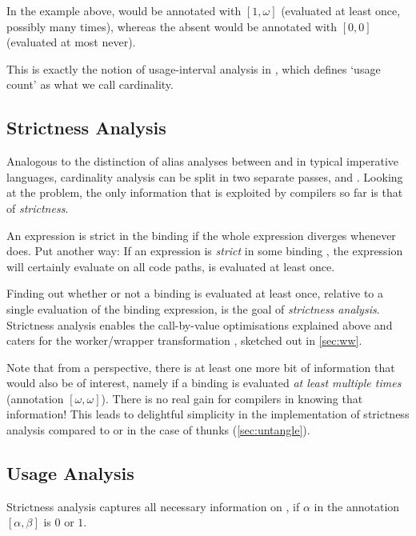 In the example above,  would be annotated with $[1,\omega]$ (evaluated at least once, possibly many times), whereas the absent  would be annotated with $[0, 0]$ (evaluated at most never).

This is exactly the notion of usage-interval analysis in \textcite[Chapter~5]{sestoft}, which defines `usage count' as what we call cardinality.

\subsection{Strictness Analysis}\label{sec:strict}

Analogous to the distinction of alias analyses between \MayAlias and \MustAlias in typical imperative languages, cardinality analysis can be split in two separate passes, \MinCard and \MaxCard. 
Looking at the \MinCard problem, the only information that is exploited by compilers so far is that of \emph{strictness}.

An expression  is strict in the binding  if the whole expression diverges whenever  does.
Put another way: 
If an expression is \emph{strict} in some binding , the expression will certainly evaluate  on all code paths, \eg {} is evaluated at least once.

Finding out whether or not a binding is evaluated at least once, relative to a single evaluation of the binding expression, is the goal of \emph{strictness analysis}.
Strictness analysis enables the call-by-value optimisations explained above and caters for the worker/wrapper transformation \parencite{ww}, sketched out in \cref{sec:ww}.

Note that from a \MinCard perspective, there is at least one more bit of information that would also be of interest, namely if a binding is evaluated \emph{at least multiple times} (\eg annotation $[\omega,\omega]$).
There is no real gain for compilers in knowing that information!
This leads to delightful simplicity in the implementation of strictness analysis compared to \MinCard or \MaxCard in the case of thunks (\cf \cref{sec:untangle}).

\subsection{Usage Analysis}\label{sec:usage}

Strictness analysis captures all necessary information on \MinCard, \eg if $\alpha$ in the annotation $[\alpha,\beta]$ is $0$ or $1$.

